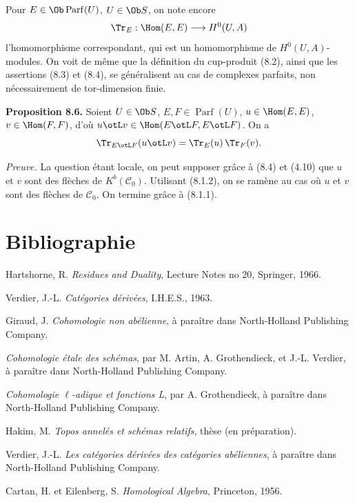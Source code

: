 \documentclass[11pt]{article}
\newcommand{\Parf}{\operatorname{Parf}}
\begin{document}
Pour \(E\in\Ob\Parf(U)\), \(U\in\Ob S\), on note encore
\[
  \Tr_E:\Hom(E,E)\longrightarrow H^0(U,A)
\]
l'homomorphisme correspondant, qui est un homomorphisme de \(H^0(U,A)\)-modules. On voit de même que la définition du cup-produit (8.2), ainsi que les assertions (8.3) et (8.4), se généralisent au cas de complexes parfaits, non nécessairement de tor-dimension finie.

\textbf{Proposition 8.6.} Soient \(U\in\Ob S\), \(E,F\in\Parf(U)\), \(u\in\Hom(E,E)\), \(v\in\Hom(F,F)\), d'où \(u\otL v\in\Hom(E\otL F,E\otL F)\). On a
\[
  \Tr_{E\otL F}(u\otL v)=\Tr_E(u)\,\Tr_F(v).
\]

\emph{Preuve.} La question étant locale, on peut supposer grâce à (8.4) et (4.10) que \(u\) et \(v\) sont des flèches de \(K^b(\mathcal C_0)\). Utilisant (8.1.2), on se ramène au cas où \(u\) et \(v\) sont des flèches de \(\mathcal C_0\). On termine grâce à (8.1.1).

\section*{Bibliographie}
\begin{description}[leftmargin=2.5cm,style=nextline]
\item[{[H]}] Hartshorne, R. \emph{Residues and Duality}, Lecture Notes no 20, Springer, 1966.
\item[{[V]}] Verdier, J.-L. \emph{Catégories dérivées}, I.H.E.S., 1963.
\item[{[G]}] Giraud, J. \emph{Cohomologie non abélienne}, à paraître dans North-Holland Publishing Company.
\item[{SGA 4}] \emph{Cohomologie étale des schémas}, par M. Artin, A. Grothendieck, et J.-L. Verdier, à paraître dans North-Holland Publishing Company.
\item[{SGA 5}] \emph{Cohomologie \(\ell\)-adique et fonctions L}, par A. Grothendieck, à paraître dans North-Holland Publishing Company.
\item[{[1]}] Hakim, M. \emph{Topos annelés et schémas relatifs}, thèse (en préparation).
\item[{[2]}] Verdier, J.-L. \emph{Les catégories dérivées des catégories abéliennes}, à paraître dans North-Holland Publishing Company.
\item[{[MUL]}] Cartan, H. et Eilenberg, S. \emph{Homological Algebra}, Princeton, 1956.
\end{description}
\end{document}
